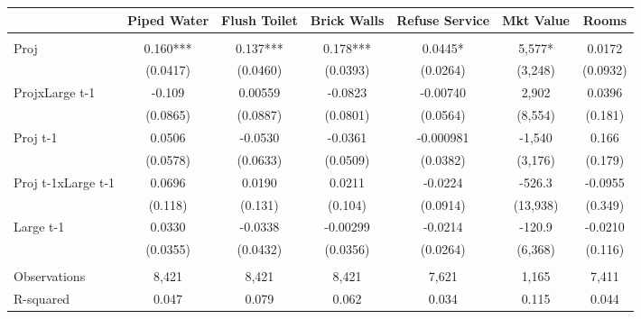 \begin{tabular}{lcccccc} 
 & Piped Water & Flush Toilet & Brick Walls & Refuse Service & Mkt Value & Rooms \\ \hline
 &  &  &  &  &  &  \\
Proj & 0.160*** & 0.137*** & 0.178*** & 0.0445* & 5,577* & 0.0172 \\
 & (0.0417) & (0.0460) & (0.0393) & (0.0264) & (3,248) & (0.0932) \\
ProjxLarge t-1 & -0.109 & 0.00559 & -0.0823 & -0.00740 & 2,902 & 0.0396 \\
 & (0.0865) & (0.0887) & (0.0801) & (0.0564) & (8,554) & (0.181) \\
Proj t-1 & 0.0506 & -0.0530 & -0.0361 & -0.000981 & -1,540 & 0.166 \\
 & (0.0578) & (0.0633) & (0.0509) & (0.0382) & (3,176) & (0.179) \\
Proj t-1xLarge t-1 & 0.0696 & 0.0190 & 0.0211 & -0.0224 & -526.3 & -0.0955 \\
 & (0.118) & (0.131) & (0.104) & (0.0914) & (13,938) & (0.349) \\
Large t-1 & 0.0330 & -0.0338 & -0.00299 & -0.0214 & -120.9 & -0.0210 \\
 & (0.0355) & (0.0432) & (0.0356) & (0.0264) & (6,368) & (0.116) \\
 &  &  &  &  &  &  \\
Observations & 8,421 & 8,421 & 8,421 & 7,621 & 1,165 & 7,411 \\
R-squared & 0.047 & 0.079 & 0.062 & 0.034 & 0.115 & 0.044 \\ \hline
\end{tabular}
